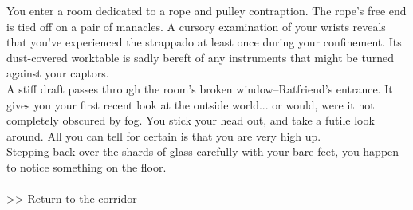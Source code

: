 You enter a room dedicated to a rope and pulley contraption. The rope’s free end is tied off on a pair of manacles. A cursory examination of your wrists reveals that you’ve experienced the strappado at least once during your confinement. Its dust-covered worktable is sadly bereft of any instruments that might be turned against your captors.\\

A stiff draft passes through the room’s broken window--Ratfriend’s entrance. It gives you your first recent look at the outside world... or would, were it not completely obscured by fog. You stick your head out, and take a futile look around. All you can tell for certain is that you are very high up.\\

Stepping back over the shards of glass carefully with your bare feet, you happen to notice something on the floor.\\
\\

>> Return to the corridor -- 